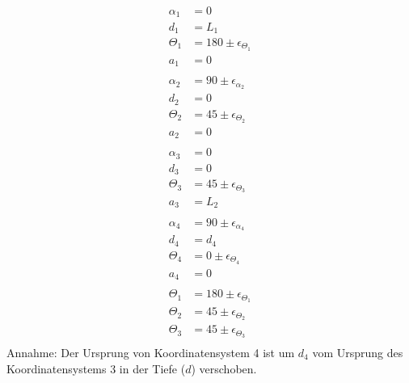 \begin{align*}
\alpha_1 &= 0 \\
d_1 &= L_1 \\
\Theta_1 &= 180 \pm \epsilon_{\Theta_1} \\
a_1 &= 0 \\
\\
\alpha_2 &= 90 \pm \epsilon_{\alpha_2} \\
d_2 &= 0 \\
\Theta_2 &= 45 \pm \epsilon_{\Theta_2} \\
a_2 &= 0 \\
\\
\alpha_3 &= 0 \\
d_3 &= 0 \\
\Theta_3 &= 45 \pm \epsilon_{\Theta_3} \\
a_3 &= L_2 \\
\\
\alpha_4 &= 90 \pm \epsilon_{\alpha_4} \\
d_4 &= d_4 \\
\Theta_4 &= 0 \pm \epsilon_{\Theta_4} \\
a_4 &= 0 \\
\\
\Theta_1 &= 180 \pm \epsilon_{\Theta_1} \\
\Theta_2 &= 45 \pm \epsilon_{\Theta_2} \\
\Theta_3 &= 45 \pm \epsilon_{\Theta_3} \\
\end{align*}
Annahme: Der Ursprung von Koordinatensystem 4 ist um $d_4$ vom Ursprung des Koordinatensystems 3 in der Tiefe ($d$) verschoben.

